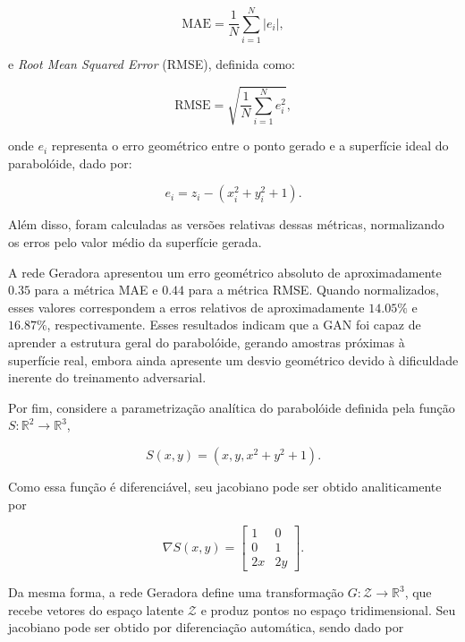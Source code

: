 \begin{equation}
\mathrm{MAE}
=
\frac{1}{N}
\sum_{i=1}^{N}
\left|
e_i
\right|,
\label{eq:mae}
\end{equation}

e \textit{Root Mean Squared Error} (RMSE), definida como:

\begin{equation}
\mathrm{RMSE}
=
\sqrt{
\frac{1}{N}
\sum_{i=1}^{N}
e_i^2
},
\label{eq:rmse}
\end{equation}

onde $e_i$ representa o erro geométrico entre o ponto gerado e a superfície ideal do parabolóide, dado por:

\begin{equation}
e_i =
z_i - (x_i^2 + y_i^2 + 1).
\label{eq:surface_error}
\end{equation}

Além disso, foram calculadas as versões relativas dessas métricas, normalizando os erros pelo valor médio da superfície gerada. 

A rede Geradora apresentou um erro geométrico absoluto de aproximadamente $0.35$ para a métrica MAE e $0.44$ para a métrica RMSE. Quando normalizados, esses valores correspondem a erros relativos de aproximadamente $14.05\%$ e $16.87\%$, respectivamente. Esses resultados indicam que a GAN foi capaz de aprender a estrutura geral do parabolóide, gerando amostras próximas à superfície real, embora ainda apresente um desvio geométrico devido à dificuldade inerente do treinamento adversarial. 

Por fim, considere a parametrização analítica do parabolóide definida pela função
$S:\mathbb{R}^{2}\rightarrow\mathbb{R}^{3}$,

\begin{equation}
S(x,y)=\left(x,y,x^{2}+y^{2}+1\right).
\end{equation}

Como essa função é diferenciável, seu jacobiano pode ser obtido analiticamente por

\begin{equation}
\nabla S(x,y)=
\begin{bmatrix}
1 & 0\\
0 & 1\\
2x & 2y
\end{bmatrix}.
\label{eq:jacobian_s}
\end{equation}

Da mesma forma, a rede Geradora define uma transformação
$G:\mathcal{Z}\rightarrow\mathbb{R}^{3}$, que recebe vetores do espaço latente
$\mathcal{Z}$ e produz pontos no espaço tridimensional. Seu jacobiano pode ser obtido por diferenciação automática, sendo dado por


